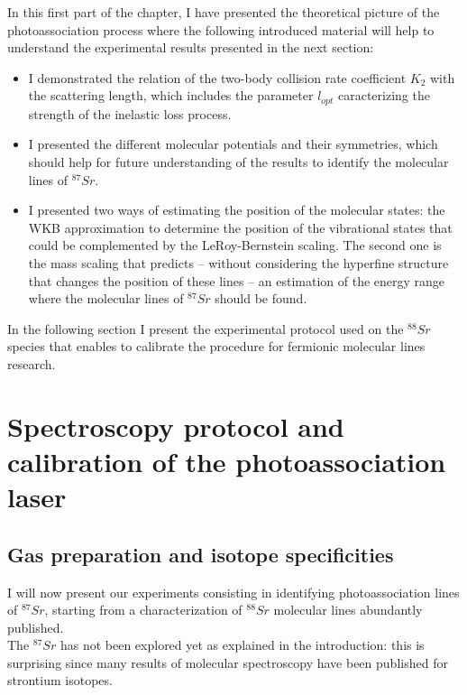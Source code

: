 In this first part of the chapter, I have presented the theoretical picture of the photoassociation process where the following introduced material will help to understand the experimental results presented in the next section:
\begin{itemize}
    \item I demonstrated the relation of the two-body collision rate coefficient $K_2$ with the scattering length, which includes the parameter $l_{opt}$ caracterizing the strength of the inelastic loss process.
    \item I presented the different molecular potentials and their symmetries, which should help for future understanding of the results to identify the molecular lines of $^{87}Sr$.
    \item I presented two ways of estimating the position of the molecular states: the WKB approximation to determine the position of the vibrational states that could be complemented by the LeRoy-Bernstein scaling.
    The second one is the mass scaling that predicts -- without considering the hyperfine structure that changes the position of these lines -- an estimation of the energy range where the molecular lines of $^{87}Sr$ should be found.
\end{itemize}

In the following section I present the experimental protocol used on the $^{88}Sr$ species that enables to calibrate the procedure for fermionic molecular lines research.
\section{Spectroscopy protocol and calibration of the photoassociation laser}

\subsection{Gas preparation and isotope specificities}
I will now present our experiments consisting in identifying photoassociation lines of $^{87}Sr$,
starting from a characterization of $^{88}Sr$ molecular lines abundantly published.\\
The $^{87}Sr$ has not been explored yet as explained in the introduction: this is surprising since
many results of molecular spectroscopy have been published for strontium isotopes.\\

